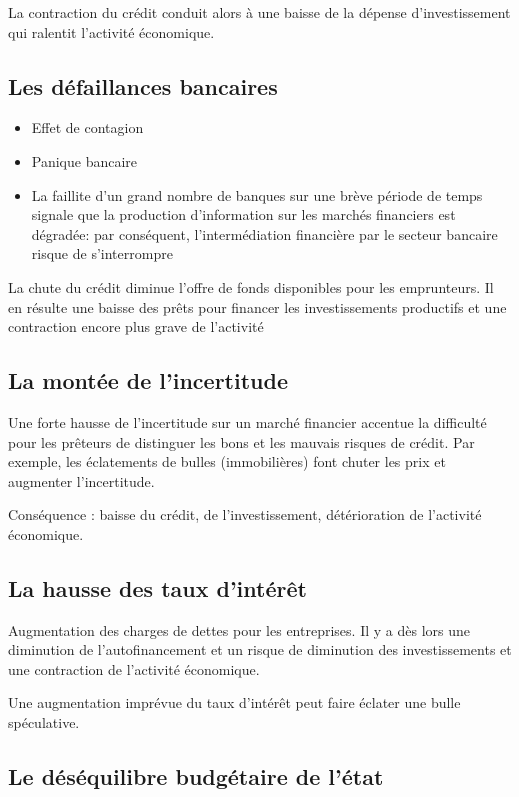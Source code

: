 	La contraction du crédit conduit alors à une baisse de la dépense d'investissement qui ralentit l'activité économique.
	
	\subsection{Les défaillances bancaires}

	\begin{itemize}
		\item Effet de contagion 
		\item Panique bancaire 
		\item La faillite d'un grand nombre de banques sur une brève période de temps signale que la production d'information sur les marchés financiers est dégradée: par conséquent, l'intermédiation financière par le secteur bancaire risque de s'interrompre 
	\end{itemize}
	
	La chute du crédit diminue l'offre de fonds disponibles pour les 
emprunteurs. Il en résulte une baisse des prêts pour financer les investissements productifs et une contraction encore plus grave de l'activité 

	\subsection{La montée de l'incertitude}
	
	Une forte hausse de l'incertitude sur un marché financier accentue la difficulté pour les prêteurs de distinguer les bons et les mauvais risques de crédit. Par exemple, les éclatements de bulles (immobilières) font chuter les prix et augmenter l'incertitude.
	
	Conséquence : baisse du crédit, de l'investissement, détérioration de l'activité économique.
	
	\subsection{La hausse des taux d'intérêt}
	
Augmentation des charges de dettes pour les entreprises. Il y a dès lors une diminution de l'autofinancement et un risque de diminution des investissements et une contraction de l'activité économique.


	Une augmentation imprévue du taux d'intérêt peut faire éclater une bulle spéculative.

	\subsection{Le déséquilibre budgétaire de l'état}
	
